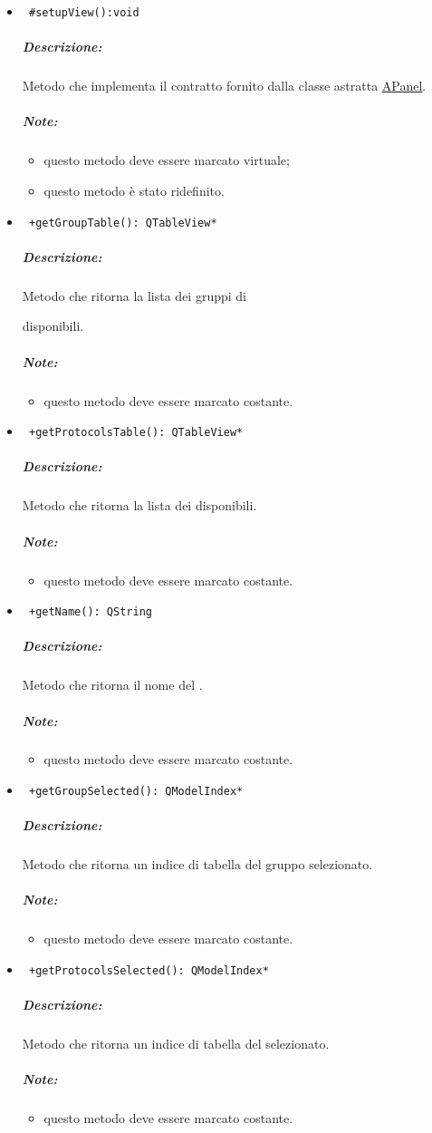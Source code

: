 \begin{itemize}
\item\color{blue}\verb! #setupView():void!
\color{black}
\subparagraph{Descrizione:}Metodo che implementa il contratto fornito dalla classe astratta \hyperref[speAPanel]{APanel}.
 \subparagraph{Note:}
 \begin{itemize}
 \item questo metodo deve essere marcato virtuale;
 \item questo metodo è stato ridefinito.
 \end{itemize}
 
\item\color{blue}\verb! +getGroupTable(): QTableView*!
\color{black} 
\subparagraph{Descrizione:}Metodo che ritorna la lista dei gruppi di \subject{} disponibili.
 \subparagraph{Note:}
 \begin{itemize}
 \item questo metodo deve essere marcato costante.
 \end{itemize}
 
\item\color{blue}\verb! +getProtocolsTable(): QTableView*!
\color{black} 
\subparagraph{Descrizione:}Metodo che ritorna la lista dei \protocol{} disponibili.
 \subparagraph{Note:}
 \begin{itemize}
 \item questo metodo deve essere marcato costante.
 \end{itemize}
\item\color{blue}\verb! +getName(): QString!
\color{black} 
\subparagraph{Descrizione:}Metodo che ritorna il nome del \dataset{}.  
 \subparagraph{Note:}
 \begin{itemize}
 \item questo metodo deve essere marcato costante.
 \end{itemize}
  
\item\color{blue}\verb! +getGroupSelected(): QModelIndex*!
\color{black} 
\subparagraph{Descrizione:}Metodo che ritorna un indice di tabella del gruppo selezionato.  
 \subparagraph{Note:}
 \begin{itemize}
 \item questo metodo deve essere marcato costante.
 \end{itemize}
 
\item\color{blue}\verb! +getProtocolsSelected(): QModelIndex*!
\color{black} 
\subparagraph{Descrizione:}Metodo che ritorna un indice di tabella del \protocol{}selezionato.  
 \subparagraph{Note:}
 \begin{itemize}
 \item questo metodo deve essere marcato costante.
 \end{itemize} 
  

\end{itemize}
